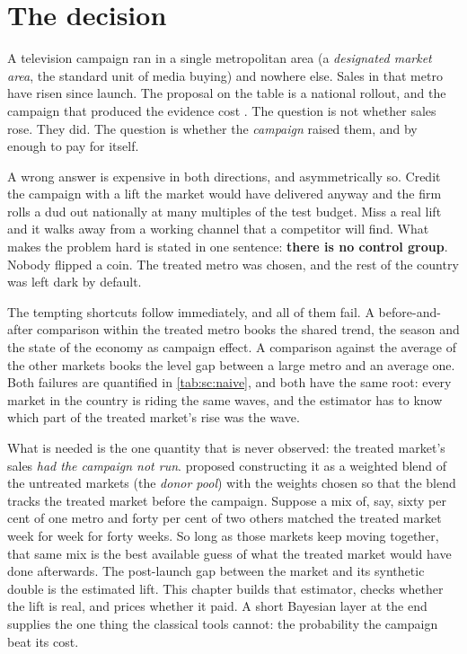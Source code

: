 \section{The decision}
\label{sec:sc:decision}

A television campaign ran in a single metropolitan area (a \emph{designated market area},
the standard unit of media buying) and nowhere else. Sales in that metro have risen since
launch. The proposal on the table is a national rollout, and the campaign that produced the
evidence cost \keur{\nbSevenCost}. The question is not whether sales rose. They did. The
question is whether the \emph{campaign} raised them, and by enough to pay for itself.

A wrong answer is expensive in both directions, and asymmetrically so. Credit the campaign
with a lift the market would have delivered anyway and the firm rolls a dud out nationally at
many multiples of the test budget. Miss a real lift and it walks away from a working channel
that a competitor will find. What makes the problem hard is stated in one sentence: \textbf{there
is no control group}. Nobody flipped a coin. The treated metro was chosen, and the rest of the
country was left dark by default.

The tempting shortcuts follow immediately, and all of them fail. A before-and-after comparison
within the treated metro books the shared trend, the season and the state of the economy as
campaign effect. A comparison against the average of the other markets books the level gap
between a large metro and an average one. Both failures are quantified in \cref{tab:sc:naive},
and both have the same root: every market in the country is riding the same waves, and the
estimator has to know which part of the treated market's rise was the wave.

What is needed is the one quantity that is never observed: the treated market's sales
\emph{had the campaign not run}. \citet{abadie2003} proposed constructing it as a weighted blend
of the untreated markets (the \emph{donor pool}) with the weights chosen so that the blend
tracks the treated market before the campaign. Suppose a mix of, say, sixty per cent of one metro
and forty per cent of two others matched the treated market week for week for forty weeks. So long
as those markets keep moving together, that same mix is the best available guess of what the
treated market would have done afterwards. The post-launch gap between the market and its
synthetic double is the estimated lift. This chapter builds that estimator, checks whether the lift
is real, and prices whether it paid. A short Bayesian layer at the end supplies the one thing the
classical tools cannot: the probability the campaign beat its cost.

